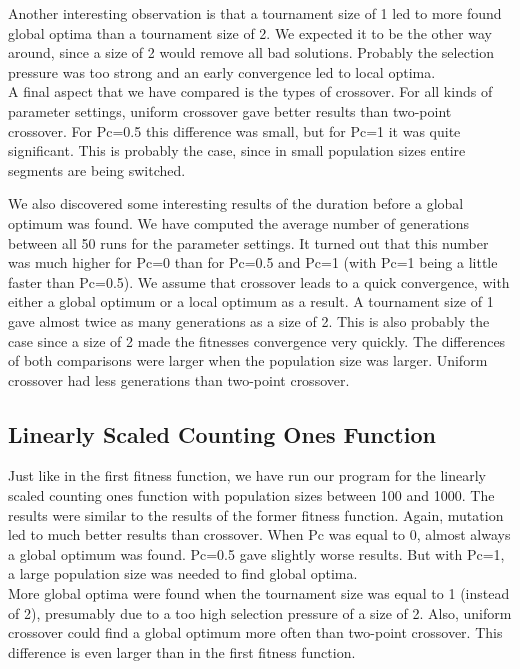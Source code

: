 \documentclass[10pt,a4paper,onecolumn]{article}
\begin{document}
Another interesting observation is that a tournament size of 1 led to more found global optima than a tournament size of 2.
We expected it to be the other way around, since a size of 2 would remove all bad solutions.
Probably the selection pressure was too strong and an early convergence led to local optima.\\

A final aspect that we have compared is the types of crossover. For all kinds of parameter settings, uniform crossover gave better results than two-point crossover.
For Pc=0.5 this difference was small, but for Pc=1 it was quite significant. This is probably the case, since in small population sizes entire segments are being switched.

We also discovered some interesting results of the duration before a global optimum was found. 
We have computed the average number of generations between all 50 runs for the parameter settings.
It turned out that this number was much higher for Pc=0 than for Pc=0.5 and Pc=1 (with Pc=1 being a little faster than Pc=0.5).
We assume that crossover leads to a quick convergence, with either a global optimum or a local optimum as a result.
A tournament size of 1 gave almost twice as many generations as a size of 2.
This is also probably the case since a size of 2 made the fitnesses convergence very quickly.
The differences of both comparisons were larger when the population size was larger.
Uniform crossover had less generations than two-point crossover.


\subsection{Linearly Scaled Counting Ones Function}

Just like in the first fitness function, we have run our program for the linearly scaled counting ones function with population sizes between 100 and 1000.
The results were similar to the results of the former fitness function.
Again, mutation led to much better results than crossover.
When Pc was equal to 0, almost always a global optimum was found. Pc=0.5 gave slightly worse results.
But with Pc=1, a large population size was needed to find global optima.\\

More global optima were found when the tournament size was equal to 1 (instead of 2), presumably due to a too high selection pressure of a size of 2. Also, uniform crossover could find a global optimum more often than two-point crossover.
This difference is even larger than in the first fitness function.
\end{document}

